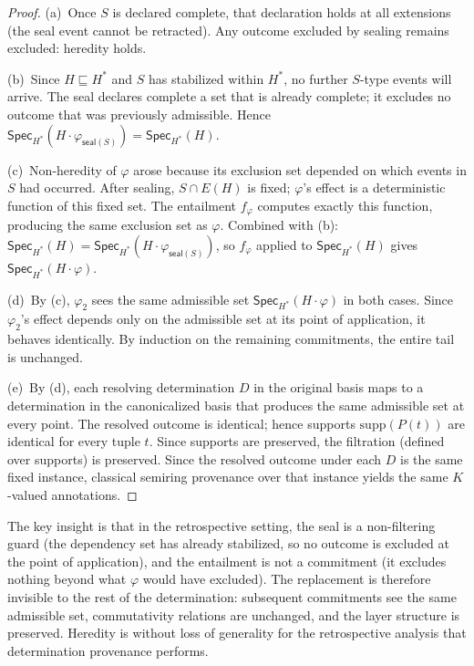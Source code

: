 \documentclass[acmsmall,review,anonymous]{acmart}
\newcommand{\Spec}{\mathsf{Spec}}
\newcommand{\seal}{\mathsf{seal}}
\theoremstyle{remark}
\numberwithin{definition}{section}
\numberwithin{theorem}{section}
\numberwithin{lemma}{section}
\numberwithin{corollary}{section}
\numberwithin{remark}{section}
\numberwithin{example}{section}
\numberwithin{observation}{section}
\numberwithin{assumption}{section}
\begin{document}
\begin{proof}
  (a)~Once $S$ is declared complete, that declaration holds at all
  extensions (the seal event cannot be retracted).
  Any outcome excluded by sealing remains excluded: heredity holds.

  (b)~Since $H \sqsubseteq H^*$ and $S$ has stabilized within $H^*$,
  no further $S$-type events will arrive.
  The seal declares complete a set that is already complete; it excludes
  no outcome that was previously admissible.
  Hence $\Spec_{H^*}(H \cdot \varphi_{\seal(S)}) = \Spec_{H^*}(H)$.

  (c)~Non-heredity of $\varphi$ arose because its exclusion set
  depended on which events in $S$ had occurred.
  After sealing, $S \cap E(H)$ is fixed; $\varphi$'s effect is a
  deterministic function of this fixed set.
  The entailment $f_\varphi$ computes exactly this function, producing
  the same exclusion set as $\varphi$.
  Combined with (b): $\Spec_{H^*}(H) = \Spec_{H^*}(H \cdot \varphi_{\seal(S)})$,
  so $f_\varphi$ applied to $\Spec_{H^*}(H)$ gives $\Spec_{H^*}(H \cdot \varphi)$.

  (d)~By (c), $\varphi_2$ sees the same admissible set
  $\Spec_{H^*}(H \cdot \varphi)$ in both cases.
  Since $\varphi_2$'s effect depends only on the admissible set at its
  point of application, it behaves identically.
  By induction on the remaining commitments, the entire tail is unchanged.

  (e)~By (d), each resolving determination $D$ in the original basis
  maps to a determination in the canonicalized basis that produces the
  same admissible set at every point.
  The resolved outcome is identical; hence supports
  $\mathrm{supp}(P(t))$ are identical for every tuple $t$.
  Since supports are preserved, the filtration (defined over supports)
  is preserved.
  Since the resolved outcome under each $D$ is the same fixed instance,
  classical semiring provenance over that instance yields the same
  $K$-valued annotations.
\end{proof}

\noindent
The key insight is that in the retrospective setting, the seal is a
non-filtering guard (the dependency set has already stabilized, so no
outcome is excluded at the point of application),
and the entailment is not a commitment (it excludes nothing beyond what
$\varphi$ would have excluded).
The replacement is therefore invisible to the rest of the
determination: subsequent commitments see the same admissible set,
commutativity relations are unchanged, and the layer structure is
preserved.
Heredity is without loss of generality for the retrospective
analysis that determination provenance performs.
\end{document}
